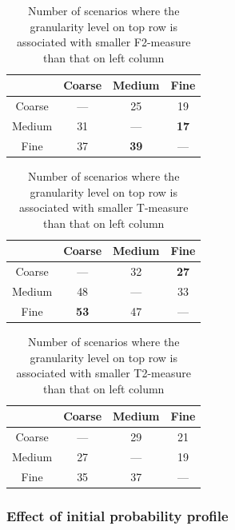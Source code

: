 \documentclass[10pt,journal,compsoc]{IEEEtran}
\begin{document}
\begin{table}
\caption{Number of scenarios where the granularity level on top row is associated with smaller F2-measure than that on left column}
\label{tab:GstaF2}
\centering
\begin{tabular}{|c|c|c|c|} \hline
				& Coarse			& Medium			& Fine				\\ \hline
Coarse	& ---					& 25					& 19					\\ \hline
Medium	& 31					& ---					& \textbf{17}	\\ \hline
Fine		& 37					& \textbf{39}	& ---					\\ \hline
\end{tabular}
\end{table}

\begin{table}
\caption{Number of scenarios where the granularity level on top row is associated with smaller T-measure than that on left column}
\label{tab:GstaT}
\centering
\begin{tabular}{|c|c|c|c|} \hline
				& Coarse			& Medium			& Fine				\\ \hline
Coarse	& ---					& 32					& \textbf{27}	\\ \hline
Medium	& 48					& ---					& 33					\\ \hline
Fine		& \textbf{53}	& 47					& ---					\\ \hline
\end{tabular}
\end{table}

\begin{table}
\caption{Number of scenarios where the granularity level on top row is associated with smaller T2-measure than that on left column}
\label{tab:GstaT2}
\centering
\begin{tabular}{|c|c|c|c|} \hline
				& Coarse			& Medium			& Fine				\\ \hline
Coarse	& ---					& 29					& 21					\\ \hline
Medium	& 27					& ---					& 19					\\ \hline
Fine		& 35					& 37					& ---					\\ \hline
\end{tabular}
\end{table}

\subsubsection{Effect of initial probability profile}
\end{document}
